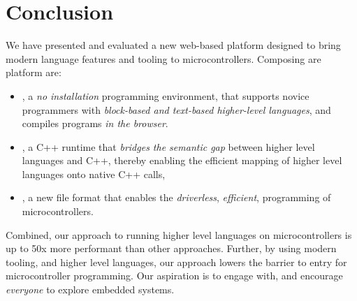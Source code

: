 \section{Conclusion}
\label{sec:conclude}

We have presented and evaluated a new web-based platform designed to bring modern language features and tooling to microcontrollers. Composing are platform are:

\begin{itemize}

\item \MCN, a \emph{no installation} programming environment, that supports novice programmers with \emph{block-based and text-based higher-level languages}, and compiles programs \emph{in the browser}.

\item \CON, a C++ runtime that \emph{bridges the semantic gap} between higher level languages and C++, thereby enabling the efficient mapping of higher level languages onto native C++ calls,

\item \UFN, a new file format that enables the \emph{driverless}, \emph{efficient}, programming of microcontrollers.

\end{itemize}

Combined, our approach to running higher level languages on microcontrollers is up to 50x more performant than other approaches. Further, by using modern tooling, and higher level languages, our approach lowers the barrier to entry for microcontroller programming. Our aspiration is to engage with, and encourage \emph{everyone} to explore embedded systems.
